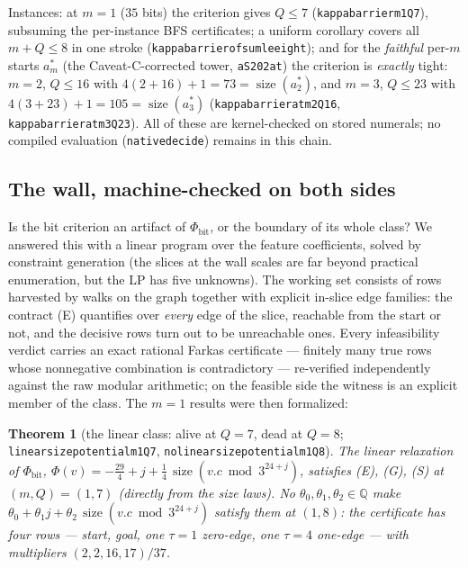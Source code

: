 \documentclass[11pt]{amsart}
\newtheorem{theorem}{Theorem}[section]
\theoremstyle{definition}
\theoremstyle{remark}
\newcommand{\size}{\operatorname{size}}
\newcommand{\lean}[1]{{\def\_{\textunderscore\allowbreak}\texttt{#1}}}
\newcommand{\Q}{\mathbb{Q}}
\begin{document}
Instances: at $m=1$ ($35$ bits) the criterion gives $Q \le 7$
(\lean{kappa\_barrier\_m1\_Q7}), subsuming the per-instance BFS certificates;
a uniform corollary covers all $m + Q \le 8$ in one stroke
(\lean{kappa\_barrier\_of\_sum\_le\_eight}); and for the \emph{faithful}
per-$m$ starts $a^{*}_m$ (the Caveat-C-corrected tower, \lean{aS202\_at})
the criterion is \emph{exactly} tight:
$m=2$, $Q \le 16$ with $4(2{+}16){+}1 = 73 = \size(a^{*}_2)$, and $m=3$,
$Q \le 23$ with $4(3{+}23){+}1 = 105 = \size(a^{*}_3)$
(\lean{kappa\_barrier\_at\_m2\_Q16}, \lean{kappa\_barrier\_at\_m3\_Q23}).
All of these are kernel-checked on stored numerals; no compiled evaluation
(\lean{native\_decide}) remains in this chain.

\subsection{The wall, machine-checked on both sides}
Is the bit criterion an artifact of $\Phi_{\mathrm{bit}}$, or the boundary of
its whole class?  We answered this with a linear program over the feature
coefficients, solved by constraint generation (the slices at the wall scales
are far beyond practical enumeration, but the LP has five unknowns).  The
working set consists of rows harvested by walks on the graph together with
explicit in-slice edge families: the contract (E) quantifies over
\emph{every} edge of the slice, reachable from the start or not, and the
decisive rows turn out to be unreachable ones.  Every infeasibility verdict
carries an exact rational Farkas certificate --- finitely many true rows
whose nonnegative combination is contradictory --- re-verified independently
against the raw modular arithmetic; on the feasible side the witness is an
explicit member of the class.  The $m=1$ results were then formalized:

\begin{theorem}[the linear class: alive at $Q=7$, dead at $Q=8$;
\lean{linear\_size\_potential\_m1\_Q7}, \lean{no\_linear\_size\_potential\_m1\_Q8}]
\label{thm:wall}
The linear relaxation of $\Phi_{\mathrm{bit}}$,
$\Phi(v) = -\tfrac{29}{4} + j + \tfrac14\,\size(v.c \bmod 3^{24+j})$,
satisfies (E), (G), (S) at $(m,Q) = (1,7)$ (directly from the size laws).
No $\theta_0, \theta_1, \theta_2 \in \Q$ make
$\theta_0 + \theta_1 j + \theta_2\,\size(v.c \bmod 3^{24+j})$ satisfy them
at $(1,8)$: the certificate has four rows --- start, goal, one $\tau{=}1$
zero-edge, one $\tau{=}4$ one-edge --- with multipliers $(2,2,16,17)/37$.
\end{theorem}
\end{document}
